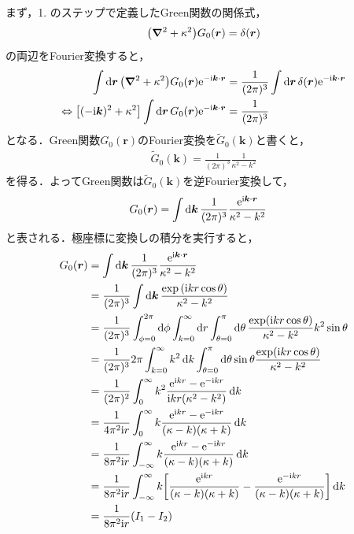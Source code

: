 \documentclass{report}
\begin{document}
    \par
    まず，1. のステップで定義したGreen関数の関係式，
    \begin{align}
      \qty(\grad^2 + \kappa^2)G_0(\bm{r}) = \delta(\bm{r})
    \end{align}
    の両辺をFourier変換すると，
    \begin{align}
      \int\dd{\bm{r}} \qty(\grad^2 + \kappa^2) G_0(\bm{r}) \mathrm{e}^{-\mathrm{i}\bm{k} \cdot \bm{r}} &= \frac{1}{(2\pi)^3}\int\dd{\bm{r}} \delta(\bm{r})\mathrm{e}^{-\mathrm{i}\bm{k}\cdot\bm{r}} \\
      \Leftrightarrow \qty[(-\mathrm{i}\bm{k})^2 + \kappa^2] \int\dd{\bm{r}} G_0(\bm{r}) \mathrm{e}^{-\mathrm{i} \bm{k}\cdot \bm{r}} &= \frac{1}{(2\pi)^3}
    \end{align}
    となる．Green関数$G_0(\bm{r})$のFourier変換を$\tilde{G}_0(\bm{k})$と書くと，
    \begin{align}
      \tilde{G}_0(\bm{k}) = \frac{1}{(2\pi)^3}\frac{1}{\kappa^2 - k^2}
    \end{align}
    を得る．よってGreen関数は$\tilde{G}_0(\bm{k})$を逆Fourier変換して，
    \begin{align}
      G_0(\bm{r}) &= \int\dd{\bm{k}} \frac{1}{(2\pi)^3}\frac{\mathrm{e}^{\mathrm{i}\bm{k} \cdot \bm{r}}}{\kappa^2 - k^2}\label{g-tilde-to-gr}
    \end{align}
    と表される．極座標に変換しの積分を実行すると，
    \begin{align}
      G_0(\bm{r}) &= \int\dd{\bm{k}} \frac{1}{(2\pi)^3}\frac{\mathrm{e}^{\mathrm{i}\bm{k} \cdot \bm{r}}}{\kappa^2 - k^2}\\ 
      &= \frac{1}{(2\pi)^3} \int\dd{\bm{k}} \frac{\exp\qty(\mathrm{i} kr\cos\theta)}{\kappa^2 - k^2} \\ 
      &= \frac{1}{(2\pi)^3} \int_{\phi = 0}^{2\pi}\dd{\phi}\int_{k = 0}^{\infty}\dd{r}\int_{\theta = 0}^{\pi}\dd{\theta} \frac{\exp(\mathrm{i} kr \cos \theta)}{\kappa^2 - k^2} k^2\sin\theta \\
      &= \frac{1}{(2\pi)^3} 2\pi \int_{k = 0}^{\infty} k^2 \dd{k} \int_{\theta = 0}^{\pi}\dd{\theta} \sin\theta\frac{\exp(\mathrm{i} k r\cos\theta)}{\kappa^2 - k^2} \\
      &= \frac{1}{(2\pi)^2} \int_{0}^{\infty}k^2\frac{\mathrm{e}^{\mathrm{i} kr} - \mathrm{e}^{-\mathrm{i} kr}}{\mathrm{i} kr\qty(\kappa^2 - k^2)}\dd{k} \\
      &= \frac{1}{4\pi^2\mathrm{i} r} \int_{0}^{\infty}k \frac{\mathrm{e}^{\mathrm{i} kr} - \mathrm{e}^{-\mathrm{i} kr}}{(\kappa - k)(\kappa + k)}\dd{k} \\
      &= \frac{1}{8\pi^2\mathrm{i} r} \int_{-\infty}^{\infty}k \frac{\mathrm{e}^{\mathrm{i} kr} - \mathrm{e}^{-\mathrm{i} kr}}{(\kappa - k)(\kappa + k)}\dd{k} \\
      &= \frac{1}{8\pi^2\mathrm{i} r} \int_{-\infty}^{\infty}k \qty[\frac{\mathrm{e}^{\mathrm{i} kr}}{(\kappa - k)(\kappa + k)} - \frac{\mathrm{e}^{-\mathrm{i} kr}}{(\kappa - k)(\kappa + k)}]\dd{k} \\
      &= \frac{1}{8\pi^2 \mathrm{i} r}\qty(I_1 - I_2)
    \end{align}
\end{document}
